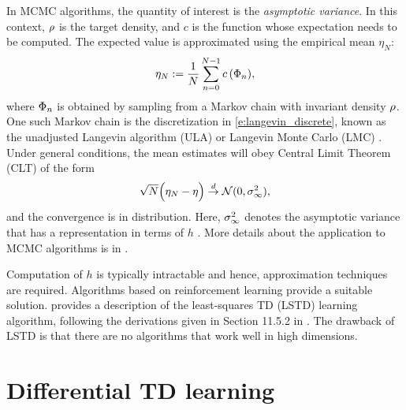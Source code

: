 In MCMC algorithms, the quantity of interest is the \textit{asymptotic variance}. In this context, $\rho$ is the target density, and $c$ is the function whose expectation needs to be computed. The expected value is approximated using the empirical mean $\eta_N$:
\[ \eta_N := \frac{1}{N} \sum_{n=0}^{N-1} c\,(\Phi_n),\]
where $\Phi_n$ is obtained by sampling from a Markov chain with invariant density $\rho$. One such Markov chain is the discretization in \eqref{e:langevin_discrete}, known as the unadjusted Langevin algorithm (ULA) or Langevin Monte Carlo (LMC) \cite{}. Under general conditions, the mean estimates will obey Central Limit Theorem (CLT) of the form
\[
\sqrt{N} \Bigl( \eta_N - \eta \Bigr) \overset{d}{\to} \mathcal{N}(0,\sigma_\infty ^2),
\]
and the convergence is in distribution. Here, $\sigma_\infty^2$ denotes the asymptotic variance that has a representation in terms of $h$ \cite{glymey96a,MT,asmgly07}. More details about the application to MCMC algorithms is in \Chapter{}. 

Computation of $h$ is typically intractable and hence, approximation techniques are required. Algorithms based on reinforcement learning provide a suitable solution.  provides a description of the least-squares TD (LSTD) learning algorithm, following the derivations given in Section 11.5.2 in \cite{ctcn}. The drawback of LSTD is that there are no algorithms that work well in high dimensions.
%	
%	
%	


\section{Differential TD learning}
\label{diff_td_learning}

